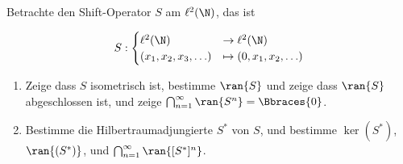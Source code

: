 \begin{exercise}[19/1]

Betrachte den Shift-Operator $S$ am $\ell^2(\N)$, das ist

\begin{align*}
  S:
  \begin{cases}
    \ell^2(\N)              & \to     \ell^2(\N) \\
    (x_1, x_2, x_3, \ldots) & \mapsto (0, x_1, x_2, \ldots)
  \end{cases}
\end{align*}

\begin{enumerate}[label = (\alph*)]

  \item
  Zeige dass $S$ isometrisch ist, bestimme $\ran{S}$ und zeige dass $\ran{S}$ abgeschlossen ist, und zeige $\bigcap_{n=1}^\infty \ran{S^n} = \Bbraces{0}$.

  \item
  Bestimme die Hilbertraumadjungierte $S^\ast$ von $S$, und bestimme $\ker{(S^\ast)}$, $\ran{(S^\ast)}$, und $\bigcap_{n=1}^\infty \ran{[S^\ast]^n}$.

\end{enumerate}

\end{exercise}

